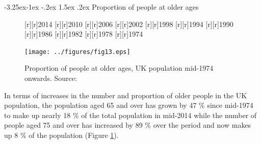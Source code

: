 \documentclass[11 pt, a4paper]{report}
\makeatletter
\renewcommand\subsection{\@startsection{subsection}{2}{\z@}%
                                     {-3.25ex\@plus -1ex \@minus -.2ex}%
                                     {1.5ex \@plus .2ex}%
    								{\large\scshape}}
\makeatother
\begin{document}
\clearpage

\subsection{Proportion of people at older ages}
\begin{figure}[hbtp!]
[r][r]{\small{2014}}
[r][r]{\small{2010}}
[r][r]{\small{2006}}
[r][r]{\small{2002}}
[r][r]{\small{1998}}
[r][r]{\small{1994}}
[r][r]{\small{1990}}
[r][r]{\small{1986}}
[r][r]{\small{1982}}
[r][r]{\small{1978}}
[r][r]{\small{1974}}



\texttt{[image: ../figures/fig13.eps]}
\caption{Proportion of people at older ages, UK population mid-1974 onwards. Source: \citet{ONS2015b}}
\label{Fig:13}
\end{figure}


In terms of increases in the number and proportion of older people in the UK population, the population aged 65 and over has grown by 47 \% since mid-1974 to make up nearly 18 \% of the total population in mid-2014 while the number of people aged 75 and over has increased by 89 \% over the period and now makes up 8 \% of the population (Figure \ref{Fig:13}). 
\end{document}
